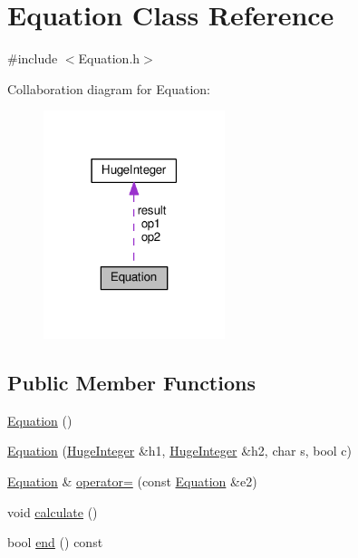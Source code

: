 \hypertarget{classEquation}{}\section{Equation Class Reference}
\label{classEquation}


{\ttfamily \#include $<$Equation.\+h$>$}



Collaboration diagram for Equation\+:
\nopagebreak
\begin{figure}[H]
\begin{center}
\leavevmode
\includegraphics[width=150pt]{classEquation__coll__graph}
\end{center}
\end{figure}
\subsection*{Public Member Functions}
\begin{DoxyCompactItemize}
\item 
\hyperlink{classEquation_a68511fc719250ed80f86c50de9136733}{Equation} ()
\item 
\hyperlink{classEquation_a060d0b8c9e447fb40baf7e7fcb154680}{Equation} (\hyperlink{classHugeInteger}{Huge\+Integer} \&h1, \hyperlink{classHugeInteger}{Huge\+Integer} \&h2, char s, bool c)
\item 
\hyperlink{classEquation}{Equation} \& \hyperlink{classEquation_a4949bc3e558de91e58376d85808fe068}{operator=} (const \hyperlink{classEquation}{Equation} \&e2)
\item 
void \hyperlink{classEquation_ab5694559600529bd6da9bb37428bfc5d}{calculate} ()
\item 
bool \hyperlink{classEquation_a373d8f9b57a3b63f1ebaafcaa92a1eb7}{end} () const 
\end{DoxyCompactItemize}
